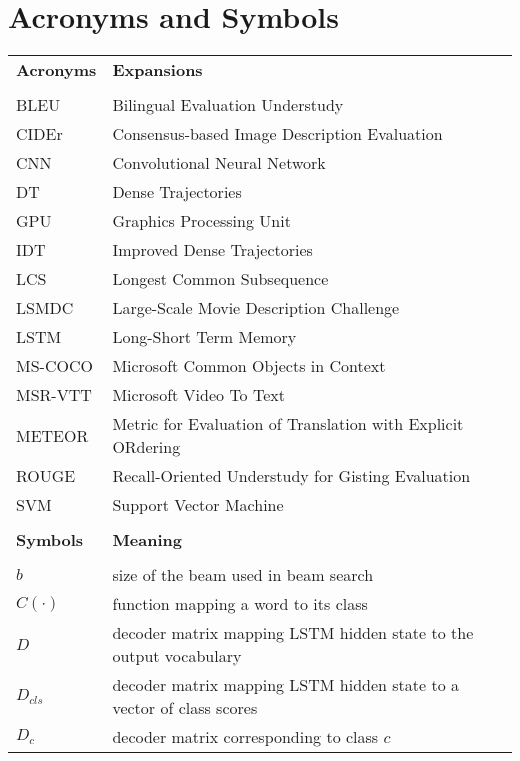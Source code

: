 \chapter*{Acronyms and Symbols}


\noindent
\begingroup
\renewcommand*{\arraystretch}{1.4} 
\begin{longtable}{@{}p{}p{}@{}}
        \bf Acronyms & \bf Expansions\\\\
        BLEU & Bilingual Evaluation Understudy\\
        CIDEr& Consensus-based Image Description Evaluation\\
        CNN & Convolutional Neural Network\\
        DT & Dense Trajectories \\
        GPU & Graphics Processing Unit \\
        IDT & Improved Dense Trajectories \\
        LCS & Longest Common Subsequence\\
        LSMDC   & Large-Scale Movie Description Challenge\\
        LSTM   & Long-Short Term Memory \\
        MS-COCO & Microsoft Common Objects in Context \\
        MSR-VTT& Microsoft Video To Text\\
        METEOR & Metric for Evaluation of Translation with Explicit ORdering \\
        ROUGE  & Recall-Oriented Understudy for Gisting Evaluation\\
        SVM & Support Vector Machine\\
        \\
        \bf Symbols & \bf Meaning\\\\
        $b$   & size of the beam used in beam search\\
        $C(\cdot)$ & function mapping a word to its class\\
        $D$ & decoder matrix mapping LSTM hidden state to the output vocabulary\\
        $D_{cls}$ & decoder matrix mapping LSTM hidden state to a vector of class scores\\
        $D_{c}$ & decoder matrix corresponding to class $c$\\

\end{longtable}
